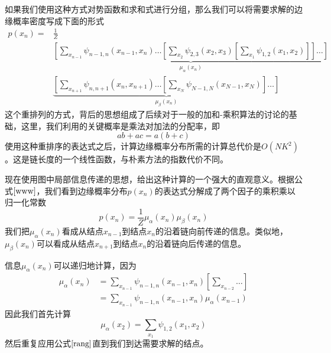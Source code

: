 如果我们使用这种方式对势函数和求和式进行分组，那么我们可以将需要求解的边缘概率密度写成下面的形式
\begin{equation}
\label{www}
	\begin{aligned}
	p(x_n)=&\frac{1}{Z}\\
	&\underbrace{\left[\sum_{x_{n-1}}\psi_{n-1,n}(x_{n-1},x_n)\dots\left[\sum_{x_2}\psi_{2,3}(x_2,x_3)\left[\sum_{x_1}\psi_{1,2}(x_1,x_2) \right] \right]\dots \right]}_{\mu_\alpha(x_n)}\\
	&\underbrace{\left[\sum_{x_{n+1}}\psi_{n,n+1}(x_{n},x_{n+1})\dots \left[\sum_{x_N}\psi_{N-1,N}(x_{N-1},x_N) \right]\dots \right]}_{\mu_\beta(x_n)}
	\end{aligned}
\end{equation}
这个重排列的方式，背后的思想组成了后续对于一般的加和-乘积算法的讨论的基础，这里，我们利用的关键概率是乘法对加法的分配率，即
\begin{equation}
	ab+ac=a(b+c)
\end{equation}
使用这种重排序的表达式之后，计算边缘概率分布所需的计算总代价是$O(NK^2)$。这是链长度的一个线性函数，与朴素方法的指数代价不同。

现在使用图中局部信息传递的思想，给出这种计算的一个强大的直观意义。根据公式$\ref{www}$，我们看到边缘概率分布$p(x_n)$的表达式分解成了两个因子的乘积乘以归一化常数
\begin{equation}
	p(x_n)=\frac{1}{Z}\mu_\alpha(x_n)\mu_\beta(x_n)
\end{equation}
我们把$\mu_\alpha(x_n)$看成从结点$x_{n-1}$到结点$x_n$的沿着链向前传递的信息。类似地，$\mu_\beta(x_n)$可以看成从结点$x_{n+1}$到结点$x_n$的沿着链向后传递的信息。

信息$\mu_\alpha(x_n)$可以递归地计算，因为 
\begin{equation}
\label{rang}
	\begin{aligned}
	\mu_\alpha(x_n)&=\sum_{x_{n-1}}\psi_{n-1,n}(x_{n-1},x_n)\left[\sum_{x_{n-2}}\dots \right]\\
	&=\sum_{x_{n-1}}\psi_{n-1,n}(x_{n-1},x_n)\mu_\alpha(x_{n-1})
	\end{aligned}
\end{equation}
因此我们首先计算 
\begin{equation}
	\mu_\alpha(x_2)=\sum_{x_1}\psi_{1,2}(x_1,x_2)
\end{equation}
然后重复应用公式$\ref{rang}$直到我们到达需要求解的结点。

